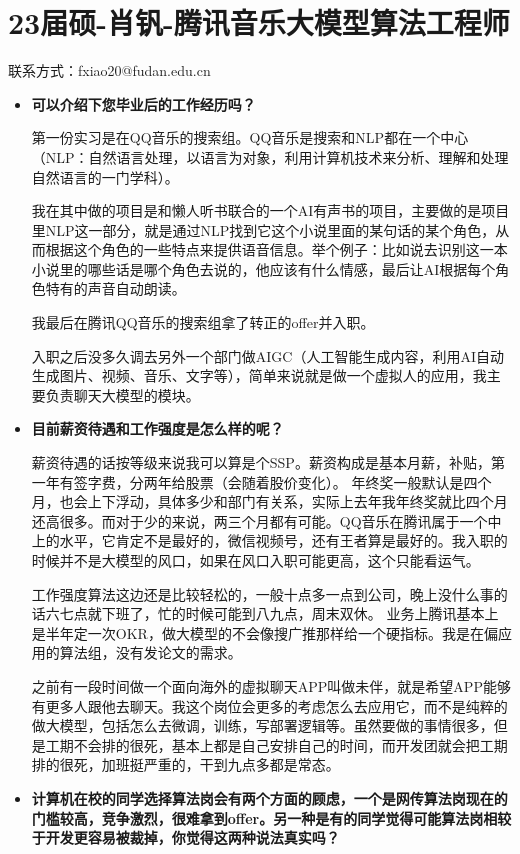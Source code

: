 \newpage
\section{23届硕-肖钒-腾讯音乐大模型算法工程师}
联系方式：fxiao20@fudan.edu.cn
\begin{itemize}

\setlength{\parindent}{2em} 
    \item \textbf{可以介绍下您毕业后的工作经历吗？}

        第一份实习是在QQ音乐的搜索组。QQ音乐是搜索和NLP都在一个中心（NLP：自然语言处理，以语言为对象，利用计算机技术来分析、理解和处理自然语言的一门学科）。

我在其中做的项目是和懒人听书联合的一个AI有声书的项目，主要做的是项目里NLP这一部分，就是通过NLP找到它这个小说里面的某句话的某个角色，从而根据这个角色的一些特点来提供语音信息。举个例子：比如说去识别这一本小说里的哪些话是哪个角色去说的，他应该有什么情感，最后让AI根据每个角色特有的声音自动朗读。

我最后在腾讯QQ音乐的搜索组拿了转正的offer并入职。

入职之后没多久调去另外一个部门做AIGC（人工智能生成内容，利用AI自动生成图片、视频、音乐、文字等），简单来说就是做一个虚拟人的应用，我主要负责聊天大模型的模块。

    \item \textbf{目前薪资待遇和工作强度是怎么样的呢？}

    薪资待遇的话按等级来说我可以算是个SSP。薪资构成是基本月薪，补贴，第一年有签字费，分两年给股票（会随着股价变化）。
年终奖一般默认是四个月，也会上下浮动，具体多少和部门有关系，实际上去年我年终奖就比四个月还高很多。而对于少的来说，两三个月都有可能。QQ音乐在腾讯属于一个中上的水平，它肯定不是最好的，微信视频号，还有王者算是最好的。我入职的时候并不是大模型的风口，如果在风口入职可能更高，这个只能看运气。

工作强度算法这边还是比较轻松的，一般十点多一点到公司，晚上没什么事的话六七点就下班了，忙的时候可能到八九点，周末双休。
业务上腾讯基本上是半年定一次OKR，做大模型的不会像搜广推那样给一个硬指标。我是在偏应用的算法组，没有发论文的需求。

之前有一段时间做一个面向海外的虚拟聊天APP叫做未伴，就是希望APP能够有更多人跟他去聊天。我这个岗位会更多的考虑怎么去应用它，而不是纯粹的做大模型，包括怎么去微调，训练，写部署逻辑等。虽然要做的事情很多，但是工期不会排的很死，基本上都是自己安排自己的时间，而开发团就会把工期排的很死，加班挺严重的，干到九点多都是常态。

    \item \textbf{计算机在校的同学选择算法岗会有两个方面的顾虑，一个是网传算法岗现在的门槛较高，竞争激烈，很难拿到offer。另一种是有的同学觉得可能算法岗相较于开发更容易被裁掉，你觉得这两种说法真实吗？}


\end{itemize}

